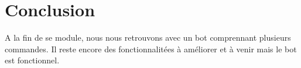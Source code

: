 \section{Conclusion}
    A la fin de se module, nous nous retrouvons avec un bot comprennant plusieurs commandes. Il reste encore des fonctionnalitées à améliorer et à venir mais le bot est fonctionnel.
